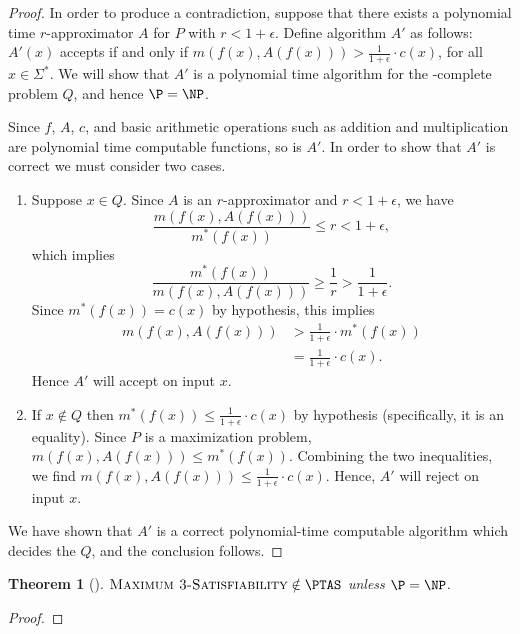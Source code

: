 \documentclass[]{article}
\theoremstyle{plain}
\newtheorem{theorem}{Theorem}
\begin{document}
\begin{proof}
  In order to produce a contradiction, suppose that there exists a polynomial time $r$-approximator $A$ for $P$ with $r < 1 + \epsilon$.
  Define algorithm $A'$ as follows: $A'(x)$ accepts if and only if $m(f(x), A(f(x))) > \frac{1}{1 + \epsilon} \cdot c(x)$, for all $x\in\Sigma^*$.
  We will show that $A'$ is a polynomial time algorithm for the \NP-complete problem $Q$, and hence $\P=\NP$.

  Since $f$, $A$, $c$, and basic arithmetic operations such as addition and multiplication are polynomial time computable functions, so is $A'$.
  In order to show that $A'$ is correct we must consider two cases.
  \begin{enumerate}
  \item
    Suppose $x \in Q$.
    Since $A$ is an $r$-approximator and $r < 1 + \epsilon$, we have
    \begin{displaymath}
      \frac{m(f(x), A(f(x)))}{m^*(f(x))} \leq r < 1 + \epsilon,
    \end{displaymath}
    which implies
    \begin{displaymath}
      \frac{m^*(f(x))}{m(f(x), A(f(x)))} \geq \frac{1}{r} > \frac{1}{1 + \epsilon}.
    \end{displaymath}
    Since $m^*(f(x)) = c(x)$ by hypothesis, this implies
    \begin{align*}
      m(f(x), A(f(x))) & > \frac{1}{1 + \epsilon} \cdot m^*(f(x)) \\
      & = \frac{1}{1 + \epsilon} \cdot c(x).
    \end{align*}
    Hence $A'$ will accept on input $x$.
  \item
    If $x \notin Q$ then $m^*(f(x)) \leq \frac{1}{1 + \epsilon} \cdot c(x)$ by hypothesis (specifically, it is an equality).
    Since $P$ is a maximization problem, $m(f(x), A(f(x))) \leq m^*(f(x))$.
    Combining the two inequalities, we find $m(f(x), A(f(x))) \leq \frac{1}{1 + \epsilon} \cdot c(x)$.
    Hence, $A'$ will reject on input $x$.
  \end{enumerate}
  We have shown that $A'$ is a correct polynomial-time computable algorithm which decides the $Q$, and the conclusion follows.
\end{proof}

\begin{theorem}[{\cite[Theorem~6.3]{book}}]
  $\textsc{Maximum 3-Satisfiability} \notin \PTAS$ unless $\P=\NP$.
\end{theorem}
\begin{proof}
  
\end{proof}
\end{document}
